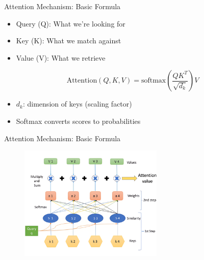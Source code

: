 \documentclass[serif, aspectratio=169]{beamer}
\begin{document}
\begin{frame}{Attention Mechanism: Basic Formula}
    \begin{itemize}
        \item Query (Q): What we're looking for
        \item Key (K): What we match against
        \item Value (V): What we retrieve
    \end{itemize}
    \begin{equation*}
        \text{Attention}(Q, K, V) = \text{softmax}\left(\frac{QK^T}{\sqrt{d_k}}\right)V
    \end{equation*}
    \begin{itemize}
        \item $d_k$: dimension of keys (scaling factor)
        \item Softmax converts scores to probabilities
    \end{itemize}
\end{frame}

\begin{frame}{Attention Mechanism: Basic Formula}
    \begin{figure}
        \centering
        \includegraphics[width=0.61\textwidth]{pic/attention-2__AIE.png}
        \label{fig:attention-2}
    \end{figure}
\end{frame}
\end{document}
